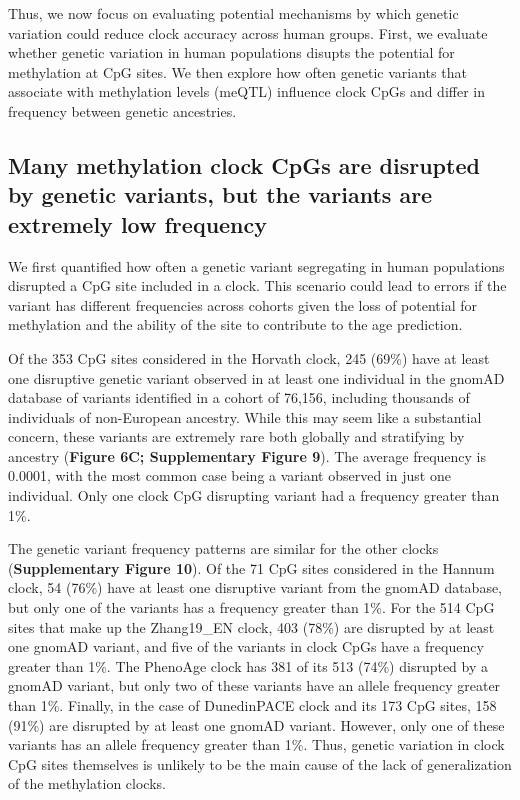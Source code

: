 Thus, we now focus on evaluating potential mechanisms by which genetic variation could reduce clock accuracy across human groups. First, we evaluate whether genetic variation in human populations disupts the potential for methylation at CpG sites. We then explore how often genetic variants that associate with methylation levels (meQTL) influence clock CpGs and differ in frequency between genetic ancestries.

\subsection{Many methylation clock CpGs are disrupted by genetic variants, but the variants are extremely low frequency}

We first quantified how often a genetic variant segregating in human populations disrupted a CpG site included in a clock. This scenario could lead to errors if the variant has different frequencies across cohorts given the loss of potential for methylation and the ability of the site to contribute to the age prediction. 

Of the 353 CpG sites considered in the Horvath clock, 245 (69\%) have at least one disruptive genetic variant observed in at least one individual in the gnomAD database of variants identified in a cohort of 76,156, including thousands of individuals of non-European ancestry. While this may seem like a substantial concern, these variants are extremely rare both globally and stratifying by ancestry (\textbf{Figure 6C; Supplementary Figure 9}). The average frequency is 0.0001, with the most common case being a variant observed in just one individual. Only one clock CpG disrupting variant had a frequency greater than 1\%. 

The genetic variant frequency patterns are similar for the other clocks (\textbf{Supplementary Figure 10}). Of the 71 CpG sites considered in the Hannum clock, 54 (76\%) have at least one disruptive variant from the gnomAD database, but only one of the variants has a frequency greater than 1\%. For the 514 CpG sites that make up the Zhang19\_EN clock, 403 (78\%) are disrupted by at least one gnomAD variant, and five of the variants in clock CpGs have a frequency greater than 1\%. The PhenoAge clock has 381 of its 513 (74\%) disrupted by a gnomAD variant, but only two of these variants have an allele frequency greater than 1\%. Finally, in the case of DunedinPACE clock and its 173 CpG sites, 158 (91\%) are disrupted by at least one gnomAD variant. However, only one of these variants has an allele frequency greater than 1\%. Thus, genetic variation in clock CpG sites themselves is unlikely to be the main cause of the lack of generalization of the methylation clocks.


